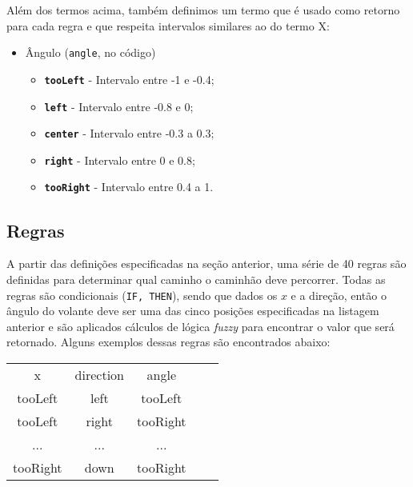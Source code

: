 \documentclass{article}
\begin{document}
        Além dos termos acima, também definimos um termo que é usado como
        retorno para cada regra e que respeita intervalos similares ao do termo
        X:
        
        \newpage
        \begin{itemize}
            \item Ângulo (\texttt{angle}, no código)
            \begin{itemize}
                \item \texttt{\textbf{tooLeft}} - Intervalo entre -1 e -0.4;
                \item \texttt{\textbf{left}} - Intervalo entre -0.8 e 0;
                \item \texttt{\textbf{center}} - Intervalo entre -0.3 a 0.3;
                \item \texttt{\textbf{right}} - Intervalo entre 0 e 0.8;
                \item \texttt{\textbf{tooRight}} - Intervalo entre 0.4 a 1.
            \end{itemize}
        \end{itemize}
    
    \subsection*{Regras}
        A partir das definições especificadas na seção anterior, uma série de
        40 regras são definidas para determinar qual caminho o caminhão deve
        percorrer. Todas as regras são condicionais (\texttt{IF, THEN}), sendo
        que dados os $x$ e a direção, então o ângulo do volante deve ser uma
        das cinco posições especificadas na listagem anterior e são aplicados
        cálculos de lógica \textit{fuzzy} para encontrar o valor que será
        retornado. Alguns exemplos dessas regras são encontrados abaixo:
        
        \begin{center}
            \begin{tabular}{c c c c c}
                \hline
                 x & direction & angle \\
                 tooLeft & left & tooLeft \\
                 tooLeft & right & tooRight \\
                 ... & ... & ... \\
                 tooRight & down & tooRight \\
                 
                \hline
            \end{tabular}
        \end{center}
        
\end{document}
